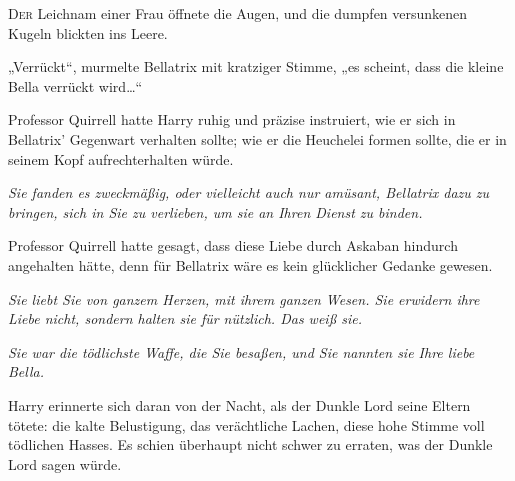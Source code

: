 
\lettrine{D}{er} Leichnam einer Frau öffnete die Augen, und die dumpfen versunkenen Kugeln blickten ins Leere.

„Verrückt“, murmelte Bellatrix mit kratziger Stimme, „es scheint, dass die kleine Bella verrückt wird…“

Professor Quirrell hatte Harry ruhig und präzise instruiert, wie er sich in Bellatrix' Gegenwart verhalten sollte; wie er die Heuchelei formen sollte, die er in seinem Kopf aufrechterhalten würde.

\emph{Sie fanden es zweckmäßig, oder vielleicht auch nur amüsant, Bellatrix dazu zu bringen, sich in Sie zu verlieben, um sie an Ihren Dienst zu binden.}

Professor Quirrell hatte gesagt, dass diese Liebe durch Askaban hindurch angehalten hätte, denn für Bellatrix wäre es kein glücklicher Gedanke gewesen.

\emph{Sie liebt Sie von ganzem Herzen, mit ihrem ganzen Wesen. Sie erwidern ihre Liebe nicht, sondern halten sie für nützlich. Das weiß sie.}

\emph{Sie war die tödlichste Waffe, die Sie besaßen, und Sie nannten sie Ihre liebe Bella.}

Harry erinnerte sich daran von der Nacht, als der Dunkle Lord seine Eltern tötete: die kalte Belustigung, das verächtliche Lachen, diese hohe Stimme voll tödlichen Hasses. Es schien überhaupt nicht schwer zu erraten, was der Dunkle Lord sagen würde.

